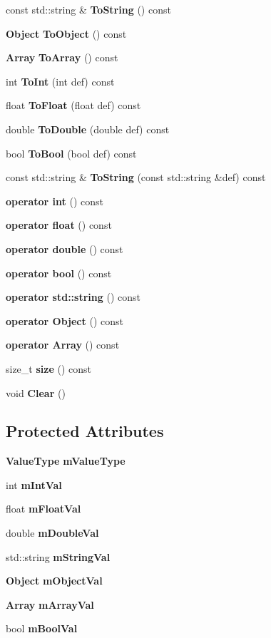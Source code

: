 \begin{DoxyCompactItemize}
\item 
const std\+::string \& {\bf To\+String} () const 
\item 
{\bf Object} {\bf To\+Object} () const 
\item 
{\bf Array} {\bf To\+Array} () const 
\item 
int {\bf To\+Int} (int def) const 
\item 
float {\bf To\+Float} (float def) const 
\item 
double {\bf To\+Double} (double def) const 
\item 
bool {\bf To\+Bool} (bool def) const 
\item 
const std\+::string \& {\bf To\+String} (const std\+::string \&def) const 
\item 
{\bf operator int} () const 
\item 
{\bf operator float} () const 
\item 
{\bf operator double} () const 
\item 
{\bf operator bool} () const 
\item 
{\bf operator std\+::string} () const 
\item 
{\bf operator Object} () const 
\item 
{\bf operator Array} () const 
\item 
size\+\_\+t {\bf size} () const 
\item 
void {\bf Clear} ()
\end{DoxyCompactItemize}
\subsection*{Protected Attributes}
\begin{DoxyCompactItemize}
\item 
{\bf Value\+Type} {\bf m\+Value\+Type}
\item 
int {\bf m\+Int\+Val}
\item 
float {\bf m\+Float\+Val}
\item 
double {\bf m\+Double\+Val}
\item 
std\+::string {\bf m\+String\+Val}
\item 
{\bf Object} {\bf m\+Object\+Val}
\item 
{\bf Array} {\bf m\+Array\+Val}
\item 
bool {\bf m\+Bool\+Val}
\end{DoxyCompactItemize}
